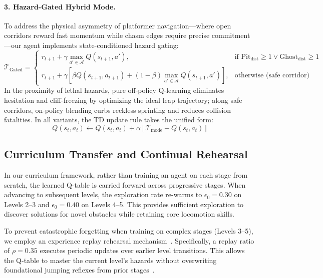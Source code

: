 \paragraph{3. Hazard-Gated Hybrid Mode.}
To address the physical asymmetry of platformer navigation---where open corridors reward fast momentum while chasm edges require precise commitment---our agent implements state-conditioned hazard gating:
\begin{equation}
\label{eq:hazard_gated}
\mathcal{T}_{\text{Gated}} = \begin{cases}
r_{t+1} + \gamma \max_{a' \in \mathcal{A}} Q(s_{t+1}, a'), & \text{if } \text{Pit}_{\text{dist}} \ge 1 \lor \text{Ghost}_{\text{dist}} \ge 1 \\
r_{t+1} + \gamma \left[ \beta Q(s_{t+1}, a_{t+1}) + (1 - \beta) \max_{a' \in \mathcal{A}} Q(s_{t+1}, a') \right], & \text{otherwise (safe corridor)}
\end{cases}
\end{equation}
In the proximity of lethal hazards, pure off-policy Q-learning eliminates hesitation and cliff-freezing by optimizing the ideal leap trajectory; along safe corridors, on-policy blending curbs reckless sprinting and reduces collision fatalities. In all variants, the TD update rule takes the unified form:
\begin{equation}
Q(s_t, a_t) \leftarrow Q(s_t, a_t) + \alpha \left[ \mathcal{T}_{\text{mode}} - Q(s_t, a_t) \right]
\end{equation}

\subsection{Curriculum Transfer and Continual Rehearsal}
In our curriculum framework, rather than training an agent on each stage from scratch, the learned Q-table is carried forward across progressive stages. When advancing to subsequent levels, the exploration rate re-warms to $\epsilon_0 = 0.30$ on Levels 2--3 and $\epsilon_0 = 0.40$ on Levels 4--5. This provides sufficient exploration to discover solutions for novel obstacles while retaining core locomotion skills.

To prevent catastrophic forgetting when training on complex stages (Levels 3--5), we employ an experience replay rehearsal mechanism~\cite{rolnick2019experience,isele2018selective}. Specifically, a replay ratio of $\rho = 0.35$ executes periodic updates over earlier level transitions. This allows the Q-table to master the current level's hazards without overwriting foundational jumping reflexes from prior stages~\cite{narvekar2020curriculum}.

